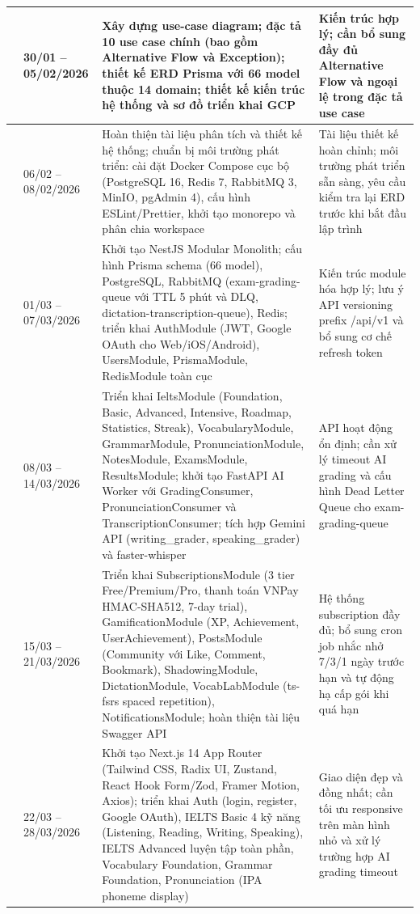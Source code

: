 \begin{longtable}{|>{\centering\arraybackslash}p{15\tbu}|p{28\tbu}|p{62\tbu}|p{40\tbu}|}
    4 & 30/01 -- 05/02/2026 & Xây dựng use-case diagram; đặc tả 10 use case chính (bao gồm Alternative Flow và Exception); thiết kế ERD Prisma với 66 model thuộc 14 domain; thiết kế kiến trúc hệ thống và sơ đồ triển khai GCP & Kiến trúc hợp lý; cần bổ sung đầy đủ Alternative Flow và ngoại lệ trong đặc tả use case \\ \hline
    5 & 06/02 -- 08/02/2026 & Hoàn thiện tài liệu phân tích và thiết kế hệ thống; chuẩn bị môi trường phát triển: cài đặt Docker Compose cục bộ (PostgreSQL 16, Redis 7, RabbitMQ 3, MinIO, pgAdmin 4), cấu hình ESLint/Prettier, khởi tạo monorepo và phân chia workspace & Tài liệu thiết kế hoàn chỉnh; môi trường phát triển sẵn sàng, yêu cầu kiểm tra lại ERD trước khi bắt đầu lập trình \\ \hline
    6 & 01/03 -- 07/03/2026 & Khởi tạo NestJS Modular Monolith; cấu hình Prisma schema (66 model), PostgreSQL, RabbitMQ (exam-grading-queue với TTL 5 phút và DLQ, dictation-transcription-queue), Redis; triển khai AuthModule (JWT, Google OAuth cho Web/iOS/Android), UsersModule, PrismaModule, RedisModule toàn cục & Kiến trúc module hóa hợp lý; lưu ý API versioning prefix /api/v1 và bổ sung cơ chế refresh token \\ \hline
    7 & 08/03 -- 14/03/2026 & Triển khai IeltsModule (Foundation, Basic, Advanced, Intensive, Roadmap, Statistics, Streak), VocabularyModule, GrammarModule, PronunciationModule, NotesModule, ExamsModule, ResultsModule; khởi tạo FastAPI AI Worker với GradingConsumer, PronunciationConsumer và TranscriptionConsumer; tích hợp Gemini API (writing\_grader, speaking\_grader) và faster-whisper & API hoạt động ổn định; cần xử lý timeout AI grading và cấu hình Dead Letter Queue cho exam-grading-queue \\ \hline
    8 & 15/03 -- 21/03/2026 & Triển khai SubscriptionsModule (3 tier Free/Premium/Pro, thanh toán VNPay HMAC-SHA512, 7-day trial), GamificationModule (XP, Achievement, UserAchievement), PostsModule (Community với Like, Comment, Bookmark), ShadowingModule, DictationModule, VocabLabModule (ts-fsrs spaced repetition), NotificationsModule; hoàn thiện tài liệu Swagger API & Hệ thống subscription đầy đủ; bổ sung cron job nhắc nhở 7/3/1 ngày trước hạn và tự động hạ cấp gói khi quá hạn \\ \hline
    9 & 22/03 -- 28/03/2026 & Khởi tạo Next.js 14 App Router (Tailwind CSS, Radix UI, Zustand, React Hook Form/Zod, Framer Motion, Axios); triển khai Auth (login, register, Google OAuth), IELTS Basic 4 kỹ năng (Listening, Reading, Writing, Speaking), IELTS Advanced luyện tập toàn phần, Vocabulary Foundation, Grammar Foundation, Pronunciation (IPA phoneme display) & Giao diện đẹp và đồng nhất; cần tối ưu responsive trên màn hình nhỏ và xử lý trường hợp AI grading timeout \\ \hline

\end{longtable}

